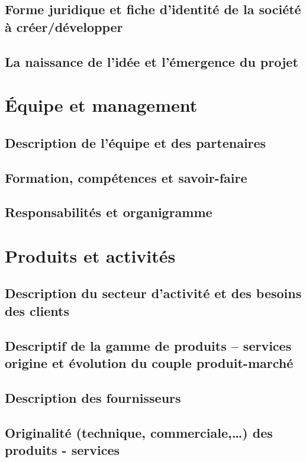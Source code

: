 \documentclass[a4paper]{report}
\begin{document}
\subsection{Forme juridique et fiche d’identité de la société à
créer/développer}

\subsection{La naissance de l’idée et l’émergence du projet}

\section{Équipe et management}

\subsection{Description de l'équipe et des partenaires}

\subsection{Formation, compétences et savoir-faire}

\subsection{Responsabilités et organigramme}

\section{Produits et activités}

\subsection{Description du secteur d'activité et des besoins des clients}

\subsection{Descriptif de la gamme de produits – services origine et
évolution du couple produit-marché}

\subsection{Description des fournisseurs}

\subsection{Originalité (technique, commerciale,…) des produits - services}
\end{document}
